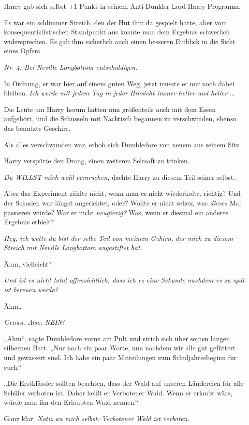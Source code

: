 {Harry gab sich selbst +1 Punkt in seinem Anti-Dunkler-Lord-Harry-Programm.

Es war ein schlimmer Streich, den der Hut ihm da gespielt hatte, aber vom konsequentialistischen Standpunkt aus konnte man dem Ergebnis schwerlich widersprechen. Es gab ihm sicherlich auch einen besseren Einblick in die Sicht eines Opfers.

\emph{Nr. 4: Bei Neville Longbottom entschuldigen.}

In Ordnung, er war hier auf einem guten Weg, jetzt musste er nur noch dabei bleiben. \emph{Ich werde mit jedem Tag in jeder Hinsicht immer heller und heller …}

Die Leute um Harry herum hatten nun größenteils auch mit dem Essen aufgehört, und die Schüsseln mit Nachtisch begannen zu verschwinden, ebenso das benutzte Geschirr.

Als alles verschwunden war, erhob sich Dumbledore von neuem aus seinem Sitz.

Harry verspürte den Drang, einen weiteren Seltsaft zu trinken.

\emph{Du WILLST mich wohl verarschen,} dachte Harry zu diesem Teil seiner selbst.

Aber das Experiment zählte nicht, wenn man es nicht wiederholte, richtig? Und der Schaden war längst angerichtet, oder? Wollte er nicht sehen, was \emph{dieses} Mal passieren würde? War er nicht \emph{neugierig?} Was, wenn er diesmal ein anderes Ergebnis erhielt?

\emph{Hey, ich wette du bist der selbe Teil von meinem Gehirn, der mich zu diesem Streich mit Neville Longbottom angestiftet hat.}

Ähm, vielleicht?

\emph{Und ist es nicht total offensichtlich, dass ich es eine Sekunde nachdem es zu spät ist bereuen werde?}

Ähm…

\emph{Genau. Also: NEIN!}

„Ähm“, sagte Dumbledore vorne am Pult und strich sich über seinen langen silbernen Bart. „Nur noch ein paar Worte, nun nachdem wir alle gut gefüttert und gewässert sind. Ich habe ein paar Mitteilungen zum Schuljahresbeginn für euch.“

„Die Erstklässler sollten beachten, dass der Wald auf unseren Ländereien für alle Schüler verboten ist. Daher heißt er Verbotener Wald. Wenn er erlaubt wäre, würde man ihn den Erlaubten Wald nennen.“

Ganz klar. \emph{Notiz an mich selbst: Verbotener Wald ist verboten.}

}
